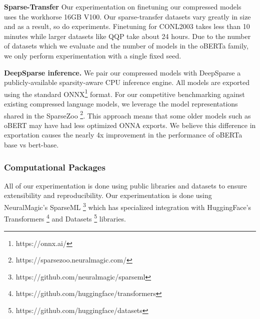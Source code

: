 \textbf{Sparse-Transfer} Our experimentation on finetuning our compressed models uses the workhorse 16GB V100. Our sparse-transfer datasets vary greatly in size and as a result, so do experiments. Finetuning for CONL2003 takes less than 10 minutes while larger datasets like QQP take about 24 hours. Due to the number of datasets which we evaluate and the number of models in the oBERTa family, we only perform experimentation with a single fixed seed.

\noindent\textbf{DeepSparse inference.} We pair our compressed models with DeepSparse \cite{deepsparse} a publicly-available sparsity-aware CPU inference engine. All models are exported using the standard ONNX\footnote{https://onnx.ai/} format. For our competitive benchmarking against existing compressed language models, we leverage the model representations shared in the SparseZoo \footnote{https://sparsezoo.neuralmagic.com/}. This approach means that some older models such as oBERT may have had less optimized ONNA exports. We believe this difference in exportation causes the nearly 4x improvement in the performance of oBERTa base vs bert-base. 

\subsubsection{Computational Packages}
All of our experimentation is done using public libraries and datasets to ensure extensibility and reproducibility. Our experimentation is done using NeuralMagic's SparseML \footnote{https://github.com/neuralmagic/sparseml} which has specialized integration with HuggingFace's Transformers \footnote{https://github.com/huggingface/transformers} and Datasets \footnote{https://github.com/huggingface/datasets} libraries.